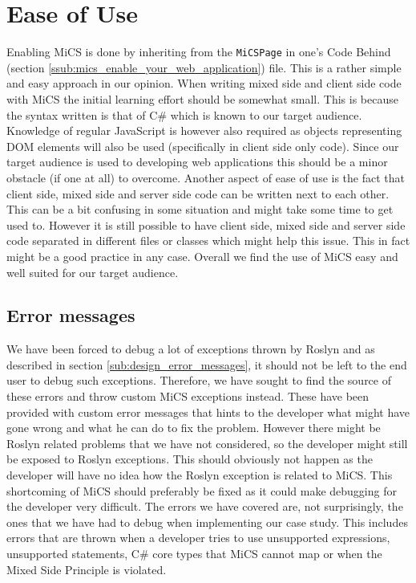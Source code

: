 \section{Ease of Use} %
\label{sec:ease_of_use}
	Enabling MiCS is done by inheriting from the \texttt{MiCSPage} in one's Code Behind (section \ref{ssub:mics_enable_your_web_application}) file. This is a rather simple and easy approach in our opinion. When writing mixed side and client side code with MiCS the initial learning effort should be somewhat small. This is because the syntax written is that of C\# which is known to our target audience. Knowledge of regular JavaScript is however also required as objects representing DOM elements will also be used (specifically in client side only code). Since our target audience is used to developing web applications this should be a minor obstacle (if one at all) to overcome. Another aspect of ease of use is the fact that client side, mixed side and server side code can be written next to each other. This can be a bit confusing in some situation and might take some time to get used to. However it is still possible to have client side, mixed side and server side code separated in different files or classes which might help this issue. This in fact might be a good practice in any case. Overall we find the use of MiCS easy and well suited for our target audience.

	\subsection{Error messages} %
	\label{sub:evaluation_of_error_messages}
		We have been forced to debug a lot of exceptions thrown by Roslyn and as described in section \ref{sub:design_error_messages}, it should not be left to the end user to debug such exceptions. Therefore, we have sought to find the source of these errors and throw custom MiCS exceptions instead. These have been provided with custom error messages that hints to the developer what might have gone wrong and what he can do to fix the problem. However there might be Roslyn related problems that we have not considered, so the developer might still be exposed to Roslyn exceptions. This should obviously not happen as the developer will have no idea how the Roslyn exception is related to MiCS. This shortcoming of MiCS should preferably be fixed as it could make debugging for the developer very difficult. The errors we have covered are, not surprisingly, the ones that we have had to debug when implementing our case study. This includes errors that are thrown when a developer tries to use unsupported expressions, unsupported statements, C\# core types that MiCS cannot map or when the Mixed Side Principle is violated.


